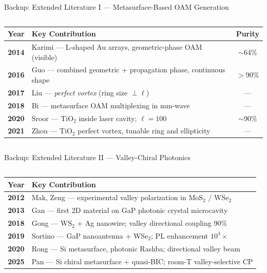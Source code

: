 \documentclass[aspectratio=169, 10pt]{beamer}
\begin{document}
\begin{frame}{Backup: Extended Literature I --- Metasurface-Based OAM Generation}
  \begin{columns}[T]
      \small\renewcommand{\arraystretch}{1.15}
      \begin{tabularx}{\linewidth}{>{\bfseries}c X c}
        \toprule
        Year & Key Contribution & Purity \\
        \midrule
        \rowcolor{lightblue}
        2014 & Karimi --- L-shaped Au arrays, geometric-phase OAM (visible) & $\sim$64\% \\
        2016 & Guo --- combined geometric + propagation phase, continuous shape & $>$90\% \\
        \rowcolor{lightblue}
        2017 & Liu --- \textit{perfect vortex} (ring size $\perp \ell$) & --- \\
        2018 & Bi --- metasurface OAM multiplexing in mm-wave & --- \\
        \rowcolor{lightblue}
        2020 & Sroor --- TiO$_2$ inside laser cavity; $\ell=100$ & $\sim$90\% \\
        2021 & Zhou --- TiO$_2$ perfect vortex, tunable ring and ellipticity & --- \\
        \bottomrule
      \end{tabularx}
  \end{columns}
\end{frame}

\begin{frame}{Backup: Extended Literature II --- Valley-Chiral Photonics}
  \begin{columns}[T]
      \small\renewcommand{\arraystretch}{1.15}
	  \begin{tabularx}{\linewidth}{>{\bfseries}c X}
        \toprule
        Year & Key Contribution \\
        \midrule
        \rowcolor{lightblue}
        2012 & Mak, Zeng --- experimental valley polarization in MoS$_2$ / WSe$_2$ \\
        2013 & Gan --- first 2D material on GaP photonic crystal microcavity \\
        \rowcolor{lightblue}
        2018 & Gong --- $\text{WS}_2$ + Ag nanowire; valley directional coupling 90\% \\
        2019 & Sortino --- GaP nanoantenna + WSe$_2$; PL enhancement $10^4\times$ \\
        \rowcolor{lightblue}
        2020 & Rong --- Si metasurface, photonic Rashba; directional valley beam \\
        2025 & Pan --- Si chiral metasurface + quasi-BIC; room-T valley-selective CP \\
        \bottomrule
      \end{tabularx}
  \end{columns}
\end{frame}
\end{document}

